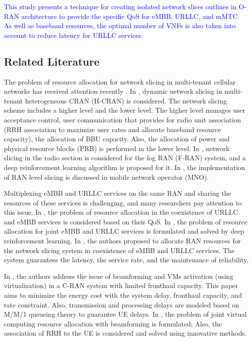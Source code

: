 \documentclass[lettersize,journal]{IEEEtran}
\begin{document}
\textcolor{blue}{This study presents a technique for creating isolated network slices outlines in O-RAN architecture to provide the specific QoS for eMBB, URLLC, and mMTC. As well as baseband resources, the optimal number of VNFs is also taken into account to reduce latency for URLLC services.}
\subsection{Related Literature}
The problem of resource allocation for network slicing in multi-tenant cellular networks has received attention recently \cite{feng2020dynamic,lee2018dynamic,lee2016new}.
In \cite{lee2018dynamic}, dynamic network slicing in multi-tenant heterogeneous CRAN (H-CRAN) is considered. The network slicing scheme includes a higher level and the lower level. The higher level manages user acceptance control, user communication that provides for radio unit association (RRH association to maximize user rates and allocate baseband resource capacity), the allocation of BBU capacity. Also, the allocation of power and physical resource blocks (PRB) is performed in the lower level.
In \cite{xiang2020realization}, network slicing in the radio section is considered for the fog RAN (F-RAN) system, and a deep reinforcement learning algorithm is proposed for it. In \cite{elayoubi20195g,d2020toward}, the implementation of RAN level slicing is discussed in mobile network operator (MNO).

Multiplexing eMBB and URLLC services on the same RAN and sharing the resources of these services is challenging, and many researchers pay attention to this issue.
In \cite{setayesh2020joint,yang2020should,saggese2021power}, the problem of resource allocation in the coexistence of URLLC and eMBB services is considered based on their QoS. 
In \cite{alsenwi2021intelligent}, the problem of resource allocation for joint eMBB and URLLC services is formulated and solved by deep reinforcement learning.
 In \cite{korrai2020ran}, the authors proposed to allocate RAN resources for the network slicing system in coexistence of eMBB and URLLC services. The system guarantees the latency, the service rate, and the maintenance of reliability.

In \cite{SystemCostMinimization,guo2016exploiting}, the authors address the issue of beamforming and VMs activation (using virtualization) in a C-RAN system with limited fronthaul capacity. 
This paper aims to minimize the energy cost with the system delay, fronthaul capacity, and rate constraint. 
Also, transmission and processing delays are modeled based on M/M/1 queueing theory to guarantee UE delays.
In \cite{luong2018joint,luong2018novel}, the problem of joint virtual computing resource allocation with beamforming is formulated; Also, the association of RRH to the UE is considered and solved using innovative methods.
\end{document}

